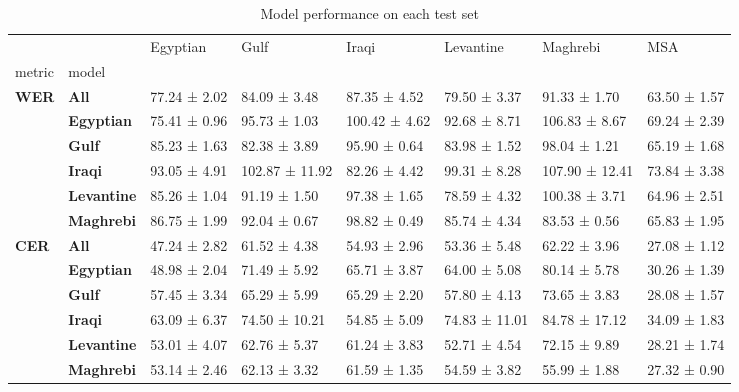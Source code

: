 \begin{table}
\caption{Model performance on each test set}
\label{tab:ex_scratch}
\begin{tabular}{llllllll}
\toprule
 &  & Egyptian & Gulf & Iraqi & Levantine & Maghrebi & MSA \\
metric & model &  &  &  &  &  &  \\
\midrule
\multirow[t]{6}{*}{\textbf{WER}} & \textbf{All} & 77.24 ± 2.02 & 84.09 ± 3.48 & 87.35 ± 4.52 & 79.50 ± 3.37 & 91.33 ± 1.70 & 63.50 ± 1.57 \\
\textbf{} & \textbf{Egyptian} & 75.41 ± 0.96 & 95.73 ± 1.03 & 100.42 ± 4.62 & 92.68 ± 8.71 & 106.83 ± 8.67 & 69.24 ± 2.39 \\
\textbf{} & \textbf{Gulf} & 85.23 ± 1.63 & 82.38 ± 3.89 & 95.90 ± 0.64 & 83.98 ± 1.52 & 98.04 ± 1.21 & 65.19 ± 1.68 \\
\textbf{} & \textbf{Iraqi} & 93.05 ± 4.91 & 102.87 ± 11.92 & 82.26 ± 4.42 & 99.31 ± 8.28 & 107.90 ± 12.41 & 73.84 ± 3.38 \\
\textbf{} & \textbf{Levantine} & 85.26 ± 1.04 & 91.19 ± 1.50 & 97.38 ± 1.65 & 78.59 ± 4.32 & 100.38 ± 3.71 & 64.96 ± 2.51 \\
\textbf{} & \textbf{Maghrebi} & 86.75 ± 1.99 & 92.04 ± 0.67 & 98.82 ± 0.49 & 85.74 ± 4.34 & 83.53 ± 0.56 & 65.83 ± 1.95 \\
\cline{1-8}
\multirow[t]{6}{*}{\textbf{CER}} & \textbf{All} & 47.24 ± 2.82 & 61.52 ± 4.38 & 54.93 ± 2.96 & 53.36 ± 5.48 & 62.22 ± 3.96 & 27.08 ± 1.12 \\
\textbf{} & \textbf{Egyptian} & 48.98 ± 2.04 & 71.49 ± 5.92 & 65.71 ± 3.87 & 64.00 ± 5.08 & 80.14 ± 5.78 & 30.26 ± 1.39 \\
\textbf{} & \textbf{Gulf} & 57.45 ± 3.34 & 65.29 ± 5.99 & 65.29 ± 2.20 & 57.80 ± 4.13 & 73.65 ± 3.83 & 28.08 ± 1.57 \\
\textbf{} & \textbf{Iraqi} & 63.09 ± 6.37 & 74.50 ± 10.21 & 54.85 ± 5.09 & 74.83 ± 11.01 & 84.78 ± 17.12 & 34.09 ± 1.83 \\
\textbf{} & \textbf{Levantine} & 53.01 ± 4.07 & 62.76 ± 5.37 & 61.24 ± 3.83 & 52.71 ± 4.54 & 72.15 ± 9.89 & 28.21 ± 1.74 \\
\textbf{} & \textbf{Maghrebi} & 53.14 ± 2.46 & 62.13 ± 3.32 & 61.59 ± 1.35 & 54.59 ± 3.82 & 55.99 ± 1.88 & 27.32 ± 0.90 \\
\cline{1-8}
\bottomrule
\end{tabular}
\end{table}
